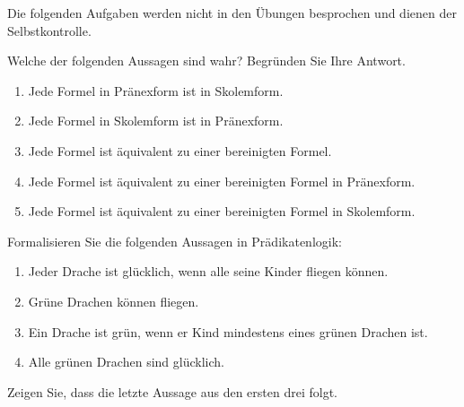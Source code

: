 \documentclass[german]{latteachCD}[2017/03/28]
\begin{document}
\maketitle

\begin{mdframed}
  Die folgenden Aufgaben werden nicht in den Übungen besprochen und dienen der
  Selbstkontrolle.

  \renewcommand{\theexercise}{\Roman{exercise}}
  \setcounter{exercise}{3}

  \begin{exercise}
    Welche der folgenden Aussagen sind wahr?  Begründen Sie Ihre Antwort.
    \begin{enumerate}
    \item Jede Formel in Pränexform ist in Skolemform.
    \item Jede Formel in Skolemform ist in Pränexform.
    \item Jede Formel ist äquivalent zu einer bereinigten Formel.
    \item Jede Formel ist äquivalent zu einer bereinigten Formel in Pränexform.
    \item Jede Formel ist äquivalent zu einer bereinigten Formel in Skolemform.
    \end{enumerate}
  \end{exercise}

  \begin{exercise}
    Formalisieren Sie die folgenden Aussagen in Prädikatenlogik:
    \begin{enumerate}
    \item Jeder Drache ist glücklich, wenn alle seine Kinder fliegen können.
    \item Grüne Drachen können fliegen.
    \item Ein Drache ist grün, wenn er Kind mindestens eines grünen Drachen ist.
    \item Alle grünen Drachen sind glücklich.
    \end{enumerate}
    Zeigen Sie, dass die letzte Aussage aus den ersten drei folgt.
  \end{exercise}
\end{mdframed}

\setcounter{exercise}{0}

\vspace*{\baselineskip}

\end{document}
